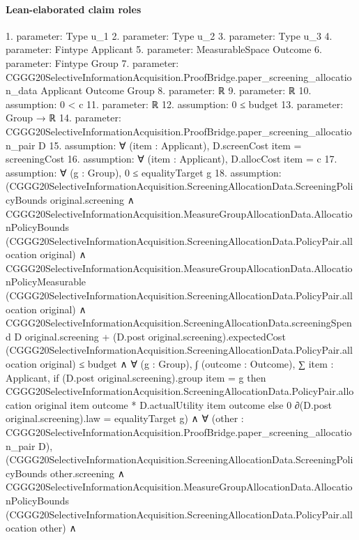 \documentclass[10pt]{article}
\begin{document}
\paragraph{Lean-elaborated claim roles}\begin{ReviewVerbatim}
1. parameter: Type u_1
2. parameter: Type u_2
3. parameter: Type u_3
4. parameter: Fintype Applicant
5. parameter: MeasurableSpace Outcome
6. parameter: Fintype Group
7. parameter: CGGG20SelectiveInformationAcquisition.ProofBridge.paper_screening_allocation_data Applicant Outcome Group
8. parameter: ℝ
9. parameter: ℝ
10. assumption: 0 < c
11. parameter: ℝ
12. assumption: 0 ≤ budget
13. parameter: Group → ℝ
14. parameter: CGGG20SelectiveInformationAcquisition.ProofBridge.paper_screening_allocation_pair D
15. assumption: ∀ (item : Applicant), D.screenCost item = screeningCost
16. assumption: ∀ (item : Applicant), D.allocCost item = c
17. assumption: ∀ (g : Group), 0 ≤ equalityTarget g
18. assumption: (CGGG20SelectiveInformationAcquisition.ScreeningAllocationData.ScreeningPolicyBounds original.screening ∧
    CGGG20SelectiveInformationAcquisition.MeasureGroupAllocationData.AllocationPolicyBounds
        (CGGG20SelectiveInformationAcquisition.ScreeningAllocationData.PolicyPair.allocation original) ∧
      CGGG20SelectiveInformationAcquisition.MeasureGroupAllocationData.AllocationPolicyMeasurable
          (CGGG20SelectiveInformationAcquisition.ScreeningAllocationData.PolicyPair.allocation original) ∧
        CGGG20SelectiveInformationAcquisition.ScreeningAllocationData.screeningSpend D original.screening +
              (D.post original.screening).expectedCost
                (CGGG20SelectiveInformationAcquisition.ScreeningAllocationData.PolicyPair.allocation original) ≤
            budget ∧
          ∀ (g : Group),
            ∫ (outcome : Outcome),
                ∑ item : Applicant,
                  if (D.post original.screening).group item = g then
                    CGGG20SelectiveInformationAcquisition.ScreeningAllocationData.PolicyPair.allocation original item
                        outcome *
                      D.actualUtility item outcome
                  else 0 ∂(D.post original.screening).law =
              equalityTarget g) ∧
  ∀ (other : CGGG20SelectiveInformationAcquisition.ProofBridge.paper_screening_allocation_pair D),
    (CGGG20SelectiveInformationAcquisition.ScreeningAllocationData.ScreeningPolicyBounds other.screening ∧
        CGGG20SelectiveInformationAcquisition.MeasureGroupAllocationData.AllocationPolicyBounds
            (CGGG20SelectiveInformationAcquisition.ScreeningAllocationData.PolicyPair.allocation other) ∧

\end{ReviewVerbatim}
\end{document}
